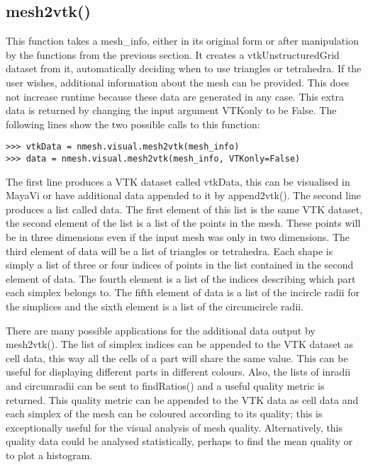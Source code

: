 \subsection{{\ttfamily mesh2vtk()}}
This function takes a {\ttfamily mesh\_info}, either in its original form or after manipulation by the functions from the previous section. It creates a vtkUnstructuredGrid dataset from it, automatically deciding when to use triangles or tetrahedra. If the user wishes, additional information about the mesh can be provided. This does not increase runtime because these data are generated in any case. This extra data is returned by changing the input argument {\ttfamily VTKonly} to be False. The following lines show the two possible calls to this function:
\begin{lstlisting}[basicstyle=\small\ttfamily]
>>> vtkData = nmesh.visual.mesh2vtk(mesh_info)
>>> data = nmesh.visual.mesh2vtk(mesh_info, VTKonly=False)
\end{lstlisting}
The first line produces a VTK dataset called {\ttfamily vtkData}, this can be visualised in MayaVi or have additional data appended to it by {\ttfamily append2vtk()}. The second line produces a list called {\ttfamily data}. The first element of this list is the same VTK dataset, the second element of the list is a list of the points in the mesh. These points will be in three dimensions even if the input mesh was only in two dimensions. The third element of {\ttfamily data} will be a list of triangles or tetrahedra. Each shape is simply a list of three or four indices of points in the list contained in the second element of {\ttfamily data}. The fourth element is a list of the indices describing which part each simplex belongs to. The fifth element of {\ttfamily data} is a list of the incircle radii for the simplices and the sixth element is a list of the circumcircle radii.

There are many possible applications for the additional data output by {\ttfamily mesh2vtk()}. The list of simplex indices can be appended to the VTK dataset as cell data, this way all the cells of a part will share the same value. This can be useful for displaying different parts in different colours. Also, the lists of inradii and circumradii can be sent to {\ttfamily findRatios()} and a useful quality metric is returned. This quality metric can be appended to the VTK data as cell data and each simplex of the mesh can be coloured according to its quality; this is exceptionally useful for the visual analysis of mesh quality. Alternatively, this quality data could be analysed statistically, perhaps to find the mean quality or to plot a histogram. 



